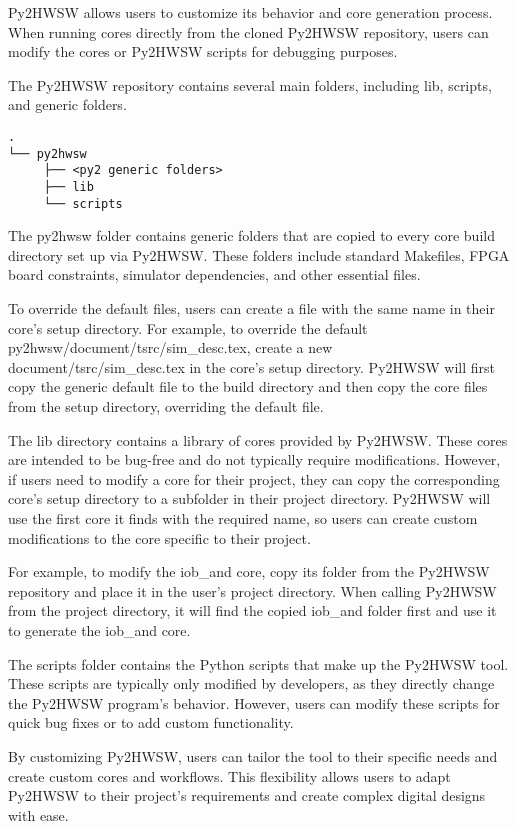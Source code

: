 %

Py2HWSW allows users to customize its behavior and core generation process. When running cores directly from the cloned Py2HWSW repository, users can modify the cores or Py2HWSW scripts for debugging purposes.

The Py2HWSW repository contains several main folders, including lib, scripts, and generic folders.
\begin{verbatim}
.
└── py2hwsw
     ├── <py2 generic folders>
     ├── lib
     └── scripts
\end{verbatim}

The py2hwsw folder contains generic folders that are copied to every core build directory set up via Py2HWSW. These folders include standard Makefiles, FPGA board constraints, simulator dependencies, and other essential files.

To override the default files, users can create a file with the same name in their core's setup directory. For example, to override the default py2hwsw/document/tsrc/sim\_desc.tex, create a new document/tsrc/sim\_desc.tex in the core's setup directory. Py2HWSW will first copy the generic default file to the build directory and then copy the core files from the setup directory, overriding the default file.

The lib directory contains a library of cores provided by Py2HWSW. These cores are intended to be bug-free and do not typically require modifications. However, if users need to modify a core for their project, they can copy the corresponding core's setup directory to a subfolder in their project directory. Py2HWSW will use the first core it finds with the required name, so users can create custom modifications to the core specific to their project.

For example, to modify the iob\_and core, copy its folder from the Py2HWSW repository and place it in the user's project directory. When calling Py2HWSW from the project directory, it will find the copied iob\_and folder first and use it to generate the iob\_and core.

The scripts folder contains the Python scripts that make up the Py2HWSW tool. These scripts are typically only modified by developers, as they directly change the Py2HWSW program's behavior. However, users can modify these scripts for quick bug fixes or to add custom functionality.

By customizing Py2HWSW, users can tailor the tool to their specific needs and create custom cores and workflows. This flexibility allows users to adapt Py2HWSW to their project's requirements and create complex digital designs with ease.

